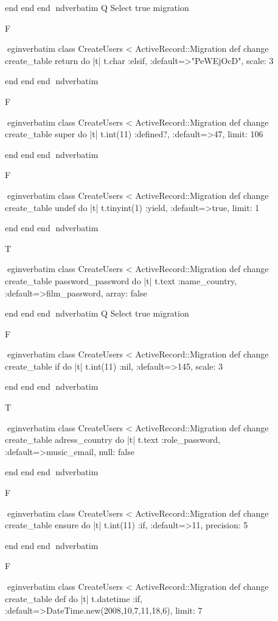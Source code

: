     end 
  end 
end
nd{verbatim}
Q
 Select true migration

F

egin{verbatim}
 class CreateUsers < ActiveRecord::Migration 
  def change 
    create_table return do |t| 
      t.char :elsif, :default=>"PeWEjOcD", scale: 3
    
    end 
  end 
end
nd{verbatim}

F

egin{verbatim}
 class CreateUsers < ActiveRecord::Migration 
  def change 
    create_table super do |t| 
      t.int(11) :defined?, :default=>47, limit: 106
    
    end 
  end 
end
nd{verbatim}

F

egin{verbatim}
 class CreateUsers < ActiveRecord::Migration 
  def change 
    create_table undef do |t| 
      t.tinyint(1) :yield, :default=>true, limit: 1
    
    end 
  end 
end
nd{verbatim}

T

egin{verbatim}
 class CreateUsers < ActiveRecord::Migration 
  def change 
    create_table password_password do |t| 
      t.text :name_country, :default=>film_password, array: false
    
    end 
  end 
end
nd{verbatim}
Q
 Select true migration

F

egin{verbatim}
 class CreateUsers < ActiveRecord::Migration 
  def change 
    create_table if do |t| 
      t.int(11) :nil, :default=>145, scale: 3
    
    end 
  end 
end
nd{verbatim}

T

egin{verbatim}
 class CreateUsers < ActiveRecord::Migration 
  def change 
    create_table adress_country do |t| 
      t.text :role_password, :default=>music_email, null: false
    
    end 
  end 
end
nd{verbatim}

F

egin{verbatim}
 class CreateUsers < ActiveRecord::Migration 
  def change 
    create_table ensure do |t| 
      t.int(11) :if, :default=>11, precision: 5
    
    end 
  end 
end
nd{verbatim}

F

egin{verbatim}
 class CreateUsers < ActiveRecord::Migration 
  def change 
    create_table def do |t| 
      t.datetime :if, :default=>DateTime.new(2008,10,7,11,18,6), limit: 7
    
